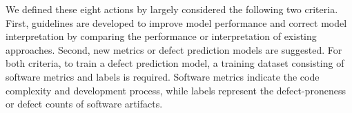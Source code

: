 
We defined these eight actions by largely considered the following two criteria. 
First, guidelines are developed to improve model performance and correct model interpretation by comparing the performance or interpretation of existing approaches. %
Second, new metrics or defect prediction models are suggested. 
For both criteria, to train a defect prediction model, a training dataset consisting of software metrics and labels is required. Software metrics indicate the code complexity and development process, while labels represent the defect-proneness or defect counts of software artifacts. 

